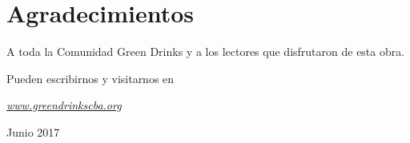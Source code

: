 

\cleardoublepage

\chapter*{Agradecimientos}

A toda la Comunidad Green Drinks y a los lectores que disfrutaron de
esta obra.

Pueden escribirnos y visitarnos en

\href{http://www.greendrinkscba.org}{\emph{www.greendrinkscba.org}}

Junio 2017
